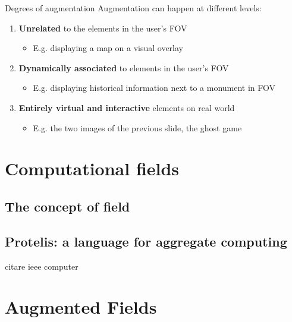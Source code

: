 \documentclass[presentation]{beamer} %
\begin{document}
\begin{frame}{Degrees of augmentation}
  Augmentation can happen at different levels:
  \begin{enumerate}
    \item \textbf{Unrelated} to the elements in the user's FOV
      \begin{itemize}
        \item E.g. displaying a map on a visual overlay
      \end{itemize}
    \item \textbf{Dynamically associated} to elements in the user's FOV
      \begin{itemize}
        \item E.g. displaying historical information next to a monument in FOV
      \end{itemize}
    \item \textbf{Entirely virtual and interactive} elements on real world
      \begin{itemize}
        \item E.g. the two images of the previous slide, the ghost game \cite{MirrorWorlds}
      \end{itemize}
  \end{enumerate}
\end{frame}

\section{Computational fields}
\subsection{The concept of field}
\subsection{Protelis: a language for aggregate computing}
citare ieee computer
\section{Augmented Fields}
\end{document}
